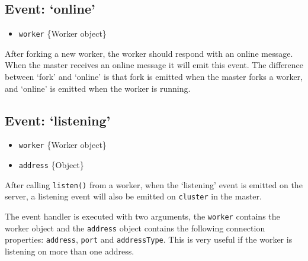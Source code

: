 \subsection{Event: `online'}\label{event-online}

\begin{itemize}
\itemsep1pt\parskip0pt
\item
  \texttt{worker} \{Worker object\}
\end{itemize}

After forking a new worker, the worker should respond with an online
message. When the master receives an online message it will emit this
event. The difference between `fork' and `online' is that fork is
emitted when the master forks a worker, and `online' is emitted when the
worker is running.

\begin{Shaded}
\begin{Highlighting}[]
\NormalTok{(}\NormalTok{, }
  \NormalTok{(}\NormalTok{);}
\NormalTok{\});}
\end{Highlighting}
\end{Shaded}

\subsection{Event: `listening'}\label{event-listening}

\begin{itemize}
\itemsep1pt\parskip0pt
\item
  \texttt{worker} \{Worker object\}
\item
  \texttt{address} \{Object\}
\end{itemize}

After calling \texttt{listen()} from a worker, when the `listening'
event is emitted on the server, a listening event will also be emitted
on \texttt{cluster} in the master.

The event handler is executed with two arguments, the \texttt{worker}
contains the worker object and the \texttt{address} object contains the
following connection properties: \texttt{address}, \texttt{port} and
\texttt{addressType}. This is very useful if the worker is listening on
more than one address.

\begin{Shaded}
\begin{Highlighting}[]
\NormalTok{(}\NormalTok{, }
  \NormalTok{(} \NormalTok{+ } \NormalTok{+ } \NormalTok{+ }\NormalTok{);}
\NormalTok{\});}
\end{Highlighting}
\end{Shaded}

